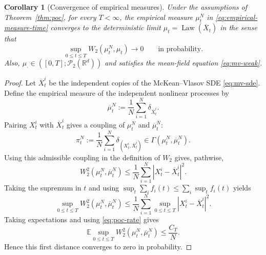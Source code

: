 \documentclass[11pt]{amsart}
\numberwithin{equation}{section}
\theoremstyle{plain}
\newtheorem{corollary}[theorem]{Corollary}
\newcommand{\R}{\mathbb{R}}
\newcommand{\E}{\mathbb{E}}
\newcommand{\cP}{\mathcal{P}}
\newcommand{\abs}[1]{\left\lvert#1\right\rvert}
\DeclareMathOperator{\Law}{Law}
\begin{document}
\begin{corollary}[Convergence of empirical measures]
\label{cor:empirical-measure-convergence}
Under the assumptions of Theorem~\ref{thm:poc}, for every $T<\infty$, the empirical measure $\mu_t^N$ in \eqref{eq:empirical-measure-time} converges to the deterministic limit $\mu_t=\Law(\overline X_t)$ in the sense that
\begin{equation}\label{eq:uniform-empirical-convergence}
 \sup_{0\leq t\leq T}W_2(\mu_t^N,\mu_t)
 \longrightarrow0
 \qquad\text{in probability}.
\end{equation}
Also, $\mu_\cdot\in ([0,T];\cP_2(\R^d))$ and satisfies the mean-field equation
\eqref{eq:mv-weak}.
\end{corollary}
\begin{proof} Let $\overline X_t^i$ be the independent copies of the McKean--Vlasov SDE \eqref{eq:mv-sde}. 
Define the empirical measure of the independent nonlinear processes by
\[
 \overline\mu_t^N:=\frac1N\sum_{i=1}^N\delta_{\overline X_t^i}.
\]
Pairing $X_t^i$ with $\overline X_t^i$ gives a coupling of
$\mu_t^N$ and $\overline\mu_t^N$: 
\[
 \pi_t^N:=\frac1N\sum_{i=1}^N
 \delta_{(X_t^i,\overline X_t^i)}
 \in\Gamma(\mu_t^N,\overline\mu_t^N).
\]
Using this admissible coupling in the definition of $W_2$ gives, pathwise,
\[
 W_2^2(\mu_t^N,\overline\mu_t^N)
 \leq\frac1N\sum_{i=1}^N\abs{X_t^i-\overline X_t^i}^2.
\]
 Taking the supremum in $t$ and using
$\sup_t\sum_i f_i(t)\leq\sum_i\sup_t f_i(t)$ yields
\[
 \sup_{0\leq t\leq T}W_2^2(\mu_t^N,\overline\mu_t^N)
 \leq\frac1N\sum_{i=1}^N
 \sup_{0\leq t\leq T}\abs{X_t^i-\overline X_t^i}^2.
\]
Taking expectations and using \eqref{eq:poc-rate} gives
\begin{equation}\label{eq:coupled-empirical-error}
 \E\sup_{0\leq t\leq T}
 W_2^2(\mu_t^N,\overline\mu_t^N)\leq\frac{C_T}{N}.
\end{equation}
Hence this first distance converges to zero in probability.


\end{proof}
\end{document}
